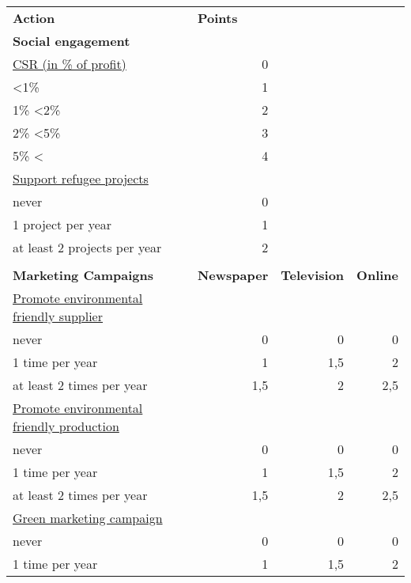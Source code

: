 \begin{table}[]
\begin{tabular}{|l|r|r|r|}
\hline
\multicolumn{1}{|l|}{\textbf{Action}}             & \multicolumn{1}{l|}{\textbf{Points}} & \multicolumn{1}{l|}{}       & \multicolumn{1}{l|}{}   \\
\textbf{Social engagement}        &       &       &  \\
\underline{CSR (in \% of profit)} & 0     &       &  \\
\textless 1\%                     & 1     &       &  \\
1\% \textless 2\%                 & 2     &       &  \\
2\% \textless 5\%                 & 3     &       &  \\
5\% \textless{}                   & 4     &       &  \\
\underline{Support refugee projects}  &   &       &  \\
never                             & 0     &       &  \\
1 project per year                & 1     &       &  \\
at least 2 projects per year      & 2     &       &  \\
&  &  &  \\
\textbf{Marketing Campaigns}  & \textbf{Newspaper} & \textbf{Television} & \textbf{Online} \\
\underline{Promote environmental friendly supplier}   & & & \\
never                             & 0    & 0      & 0 \\
1 time per year                   & 1    & 1,5    & 2 \\
at least 2 times per year         & 1,5  & 2      & 2,5 \\
\underline{Promote environmental friendly production} & & & \\
never                             & 0    & 0      & 0 \\
1 time per year                   & 1    & 1,5    & 2 \\
at least 2 times per year         & 1,5  & 2      & 2,5 \\
\underline{Green marketing campaign} & & & \\
never                             & 0    & 0      & 0 \\
1 time per year                   & 1    & 1,5    & 2 \\

\end{tabular}
\end{table}
